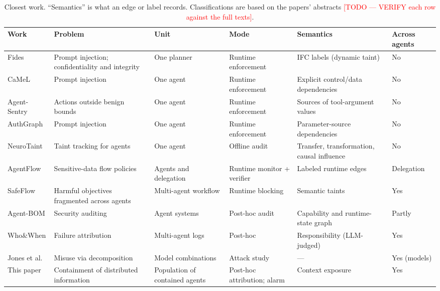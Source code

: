 \documentclass[11pt, a4paper]{article}
\newcommand{\todo}[1]{\textcolor{red}{[TODO --- #1]}}
\theoremstyle{definition}
\begin{document}
\begin{table}[t]
\centering
\footnotesize
\caption{Closest work. ``Semantics'' is what an edge or label records. Classifications are based on the papers' abstracts \todo{VERIFY each row against the full texts}.}
\label{tab:related}
\begin{tabularx}{\linewidth}{>{\raggedright\arraybackslash}p{2.1cm}>{\raggedright\arraybackslash}X>{\raggedright\arraybackslash}p{1.9cm}>{\raggedright\arraybackslash}p{1.6cm}>{\raggedright\arraybackslash}p{2.2cm}>{\raggedright\arraybackslash}p{1.6cm}}
\toprule
Work & Problem & Unit & Mode & Semantics & Across agents \\
\midrule
Fides \citep{costa2025fides} & Prompt injection; confidentiality and integrity & One planner & Runtime enforcement & IFC labels (dynamic taint) & No \\
CaMeL \citep{debenedetti2025camel} & Prompt injection & One agent & Runtime enforcement & Explicit control/data dependencies & No \\
Agent-Sentry \citep{sequeira2026agentsentry} & Actions outside benign bounds & One agent & Runtime enforcement & Sources of tool-argument values & No \\
AuthGraph \citep{wang2026authgraph} & Prompt injection & One agent & Runtime enforcement & Parameter-source dependencies & No \\
NeuroTaint \citep{cai2026neurotaint} & Taint tracking for agents & One agent & Offline audit & Transfer, transformation, causal influence & No \\
AgentFlow \citep{shivakumar2026agentflow} & Sensitive-data flow policies & Agents and delegation & Runtime monitor + verifier & Labeled runtime edges & Delegation \\
SafeFlow \citep{dai2026safeflow} & Harmful objectives fragmented across agents & Multi-agent workflow & Runtime blocking & Semantic taints & Yes \\
Agent-BOM \citep{li2026agentbom} & Security auditing & Agent systems & Post-hoc audit & Capability and runtime-state graph & Partly \\
Who\&When \citep{zhang2025whowhen} & Failure attribution & Multi-agent logs & Post-hoc & Responsibility (LLM-judged) & Yes \\
Jones et al.\ \citep{jones2025combinations} & Misuse via decomposition & Model combinations & Attack study & --- & Yes (models) \\
\midrule
This paper & Containment of distributed information & Population of contained agents & Post-hoc attribution; alarm & Context exposure & Yes \\
\bottomrule
\end{tabularx}
\end{table}
\end{document}
